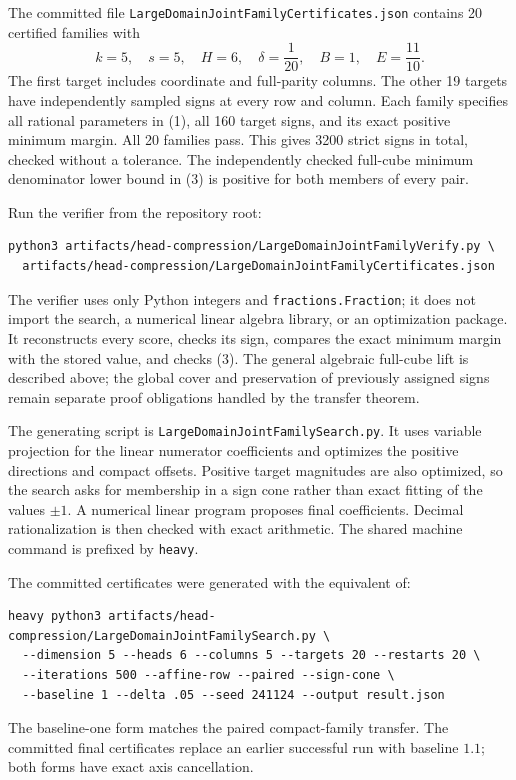 \documentclass[11pt]{article}
\begin{document}
The committed file \texttt{LargeDomainJointFamilyCertificates.json}
contains 20 certified families with
\[
k=5,\quad s=5,\quad H=6,\quad
\delta=\frac1{20},\quad B=1,\quad E=\frac{11}{10}.
\]
The first target includes coordinate and full-parity columns. The other
19 targets have independently sampled signs at every row and column.
Each family specifies all rational parameters in (1), all 160 target
signs, and its exact positive minimum margin. All 20 families pass.
This gives 3200 strict signs in total, checked without a tolerance.
The independently checked full-cube minimum denominator lower bound
in (3) is positive for both members of every pair.

Run the verifier from the repository root:
\begin{verbatim}
python3 artifacts/head-compression/LargeDomainJointFamilyVerify.py \
  artifacts/head-compression/LargeDomainJointFamilyCertificates.json
\end{verbatim}
The verifier uses only Python integers and \texttt{fractions.Fraction};
it does not import the search, a numerical linear algebra library, or an
optimization package. It reconstructs every score, checks its sign,
compares the exact minimum margin with the stored value, and checks (3).
The general algebraic full-cube lift is described above; the global
cover and preservation of previously assigned signs remain separate
proof obligations handled by the transfer theorem.

The generating script is \texttt{LargeDomainJointFamilySearch.py}. It
uses variable projection for the linear numerator coefficients and
optimizes the positive directions and compact offsets. Positive target
magnitudes are also optimized, so the search asks for membership in a
sign cone rather than exact fitting of the values $\pm1$. A numerical
linear program proposes final coefficients. Decimal rationalization is
then checked with exact arithmetic. The shared machine command is
prefixed by \texttt{heavy}.

The committed certificates were generated with the equivalent of:
\begin{verbatim}
heavy python3 artifacts/head-compression/LargeDomainJointFamilySearch.py \
  --dimension 5 --heads 6 --columns 5 --targets 20 --restarts 20 \
  --iterations 500 --affine-row --paired --sign-cone \
  --baseline 1 --delta .05 --seed 241124 --output result.json
\end{verbatim}
The baseline-one form matches the paired compact-family transfer.
The committed final certificates replace an earlier successful run with
baseline $1.1$; both forms have exact axis cancellation.
\end{document}
